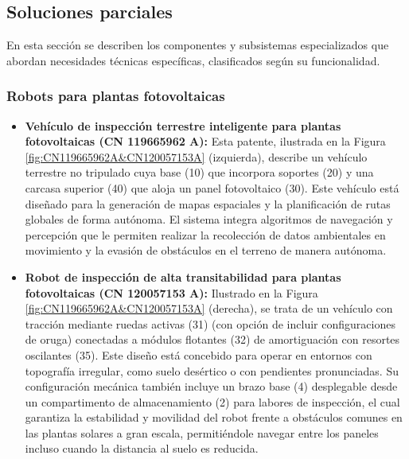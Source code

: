 \vspace{-1.5cm}
\subsection{Soluciones parciales}
En esta sección se describen los componentes y subsistemas especializados que abordan necesidades técnicas específicas, clasificados según su funcionalidad.

\subsubsection{Robots para plantas fotovoltaicas}
\begin{itemize}
	\item \textbf{Vehículo de inspección terrestre inteligente para plantas fotovoltaicas (CN 119665962 A):} Esta patente, ilustrada en la Figura \ref{fig:CN119665962A&CN120057153A} (izquierda), describe un vehículo terrestre no tripulado cuya base (10) que incorpora soportes (20) y una carcasa superior (40) que aloja un panel fotovoltaico (30). Este vehículo está diseñado para la generación de mapas espaciales y la planificación de rutas globales de forma autónoma. El sistema integra algoritmos de navegación y percepción que le permiten realizar la recolección de datos ambientales en movimiento y la evasión de obstáculos en el terreno de manera autónoma.
	
	\item \textbf{Robot de inspección de alta transitabilidad para plantas fotovoltaicas (CN 120057153 A):} Ilustrado en la Figura \ref{fig:CN119665962A&CN120057153A} (derecha), se trata de un vehículo con tracción mediante ruedas activas (31) (con opción de incluir configuraciones de oruga) conectadas a módulos flotantes (32) de amortiguación con resortes oscilantes (35). Este diseño está concebido para operar en entornos con topografía irregular, como suelo desértico o con pendientes pronunciadas. Su configuración mecánica también incluye un brazo base (4) desplegable desde un compartimento de almacenamiento (2) para labores de inspección, el cual garantiza la estabilidad y movilidad del robot frente a obstáculos comunes en las plantas solares a gran escala, permitiéndole navegar entre los paneles incluso cuando la distancia al suelo es reducida.
	
	
	\begin{figure}[H]
		
		\captionsetup{justification=raggedright, singlelinecheck=false, labelsep=none}
		

\end{figure}
\end{itemize}
